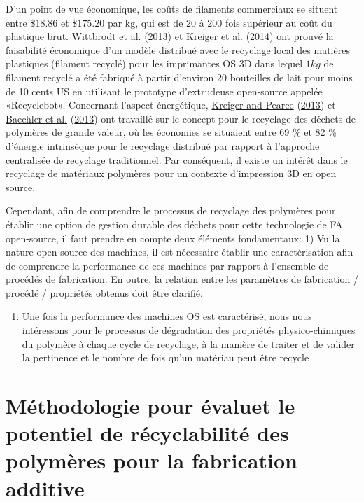 \documentclass[
]{article}
\providecommand{\tightlist}{%
  \setlength{\itemsep}{0pt}\setlength{\parskip}{0pt}}
\begin{document}
D'un point de vue économique, les coûts de filaments commerciaux se
situent entre \(\$18.86\) et \(\$175.20\) par kg, qui est de 20 à 200
fois supérieur au coût du plastique brut.
\protect\hyperlink{ref-Wittbrodt2013}{Wittbrodt et al.}
(\protect\hyperlink{ref-Wittbrodt2013}{2013}) et
\protect\hyperlink{ref-Kreiger2014}{Kreiger et al.}
(\protect\hyperlink{ref-Kreiger2014}{2014}) ont prouvé la faisabilité
économique d'un modèle distribué avec le recyclage local des matières
plastiques (filament recyclé) pour les imprimantes OS 3D dans lequel
\(1 kg\) de filament recyclé a été fabriqué à partir d'environ 20
bouteilles de lait pour moins de 10 cents US en utilisant le prototype
d'extrudeuse open-source appelée «Recyclebot». Concernant l'aspect
énergétique, \protect\hyperlink{ref-Kreiger2013}{Kreiger and Pearce}
(\protect\hyperlink{ref-Kreiger2013}{2013}) et
\protect\hyperlink{ref-Baechler2013}{Baechler et al.}
(\protect\hyperlink{ref-Baechler2013}{2013}) ont travaillé sur le
concept pour le recyclage des déchets de polymères de grande valeur, où
les économies se situaient entre 69 \% et 82 \% d'énergie intrinsèque
pour le recyclage distribué par rapport à l'approche centralisée de
recyclage traditionnel. Par conséquent, il existe un intérêt dans le
recyclage de matériaux polymères pour un contexte d'impression 3D en
open source.

Cependant, afin de comprendre le processus de recyclage des polymères
pour établir une option de gestion durable des déchets pour cette
technologie de FA open-source, il faut prendre en compte deux éléments
fondamentaux: 1) Vu la nature open-source des machines, il est
nécessaire établir une caractérisation afin de comprendre la performance
de ces machines par rapport à l'ensemble de procédés de fabrication. En
outre, la relation entre les paramètres de fabrication / procédé /
propriétés obtenus doit être clarifié.

\begin{enumerate}
\def\labelenumi{\arabic{enumi})}
\setcounter{enumi}{1}
\tightlist
\item
  Une fois la performance des machines OS est caractérisé, nous nous
  intéressons pour le processus de dégradation des propriétés
  physico-chimiques du polymère à chaque cycle de recyclage, à la
  manière de traiter et de valider la pertinence et le nombre de fois
  qu'un matériau peut être recycle
\end{enumerate}

\hypertarget{muxe9thodologie-pour-recycler-des-polymuxe8res-pour-la-fabrication-additive}{%
\section{Méthodologie pour évaluet le potentiel de récyclabilité des
polymères pour la fabrication
additive}\label{muxe9thodologie-pour-recycler-des-polymuxe8res-pour-la-fabrication-additive}}
\end{document}
